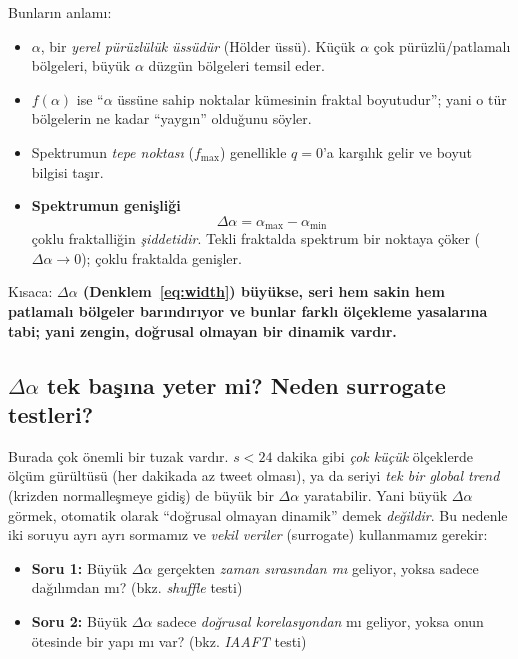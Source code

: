 \documentclass[11pt,a4paper]{article}
\newcommand{\Dal}{\Delta\alpha}
\begin{document}
Bunların anlamı:
\begin{itemize}[leftmargin=1.4em]
  \item $\alpha$, bir \emph{yerel pürüzlülük üssüdür} (Hölder üssü). Küçük
        $\alpha$ çok pürüzlü/patlamalı bölgeleri, büyük $\alpha$ düzgün
        bölgeleri temsil eder.
  \item $f(\alpha)$ ise ``$\alpha$ üssüne sahip noktalar kümesinin fraktal
        boyutudur''; yani o tür bölgelerin ne kadar ``yaygın'' olduğunu söyler.
  \item Spektrumun \emph{tepe noktası} ($f_{\max}$) genellikle $q=0$'a karşılık
        gelir ve boyut bilgisi taşır.
  \item \textbf{Spektrumun genişliği}
        \begin{equation}
          \Dal = \alpha_{\max} - \alpha_{\min}
          \label{eq:width}
        \end{equation}
        çoklu fraktalliğin \emph{şiddetidir}. Tekli fraktalda spektrum bir
        noktaya çöker ($\Dal \to 0$); çoklu fraktalda genişler.
\end{itemize}

Kısaca: \textbf{$\Dal$ (Denklem~\eqref{eq:width}) büyükse, seri hem sakin hem
patlamalı bölgeler barındırıyor ve bunlar farklı ölçekleme yasalarına tabi;
yani zengin, doğrusal olmayan bir dinamik vardır.}

\subsection{$\Dal$ tek başına yeter mi? Neden surrogate testleri?}

Burada çok önemli bir tuzak vardır. $s<24$ dakika gibi \emph{çok küçük}
ölçeklerde ölçüm gürültüsü (her dakikada az tweet olması), ya da seriyi
\emph{tek bir global trend} (krizden normalleşmeye gidiş) de büyük bir $\Dal$
yaratabilir. Yani büyük $\Dal$ görmek, otomatik olarak ``doğrusal olmayan
dinamik'' demek \emph{değildir}. Bu nedenle iki soruyu ayrı ayrı sormamız ve
\emph{vekil veriler} (surrogate) kullanmamız gerekir:

\begin{itemize}[leftmargin=1.4em]
  \item \textbf{Soru 1:} Büyük $\Dal$ gerçekten \emph{zaman sırasından mı}
        geliyor, yoksa sadece dağılımdan mı? (bkz. \emph{shuffle} testi)
  \item \textbf{Soru 2:} Büyük $\Dal$ sadece \emph{doğrusal korelasyondan} mı
        geliyor, yoksa onun ötesinde bir yapı mı var? (bkz. \emph{IAAFT} testi)
\end{itemize}
\end{document}

